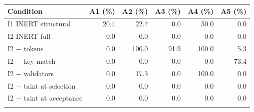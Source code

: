 \begin{tabular}{@{}lrrrrr@{}}
\toprule
Condition & A1 (\%) & A2 (\%) & A3 (\%) & A4 (\%) & A5 (\%) \\
\midrule
I1 INERT structural & 20.4 & 22.7 & 0.0 & 50.0 & 0.0 \\
I2 INERT full & 0.0 & 0.0 & 0.0 & 0.0 & 0.0 \\
I2 $-$ tokens & 0.0 & 100.0 & 91.9 & 100.0 & 5.3 \\
I2 $-$ key match & 0.0 & 0.0 & 0.0 & 0.0 & 73.4 \\
I2 $-$ validators & 0.0 & 17.3 & 0.0 & 100.0 & 0.0 \\
I2 $-$ taint at selection & 0.0 & 0.0 & 0.0 & 0.0 & 0.0 \\
I2 $-$ taint at acceptance & 0.0 & 0.0 & 0.0 & 0.0 & 0.0 \\
\botrule
\end{tabular}
